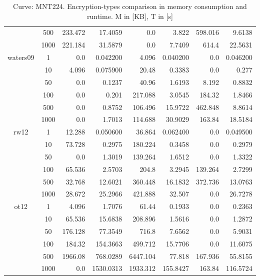 \documentclass[twoside,11pt,titlepage,a4paper,english,bibliography=totocnumbered,listof=numbered]{scrbook}
\begin{document}
\begin{table}[ht]
{\begin{tabular}{|c|c|r|r|r|r|r|r|}
&500&  233.472    &   17.4059   &    0.0      &    3.822    &  598.016    &    9.6138    \\
&1000&  221.184    &   31.5879   &    0.0      &    7.7409   &  614.4      &   22.5631    \\
\hline
\multirow{6}{*}{waters09} &1&    0.0      &    0.042200 &    4.096    &    0.040200 &    0.0      &    0.046200  \\
&10&    4.096    &    0.075900 &   20.48     &    0.3383   &    0.0      &    0.277     \\
&50&    0.0      &    0.1237   &   40.96     &    1.6193   &    8.192    &    0.8832    \\
&100&    0.0      &    0.201    &  217.088    &    3.0545   &  184.32     &    1.8466    \\
&500&    0.0      &    0.8752   &  106.496    &   15.9722   &  462.848    &    8.8614    \\
&1000&    0.0      &    1.7013   &  114.688    &   30.9029   &  163.84     &   18.5184    \\
\hline
\multirow{6}{*}{rw12} &1&   12.288    &    0.050600 &   36.864    &    0.062400 &    0.0      &    0.049500  \\
&10&   73.728    &    0.2975   &  180.224    &    0.3458   &    0.0      &    0.2979    \\
&50&    0.0      &    1.3019   &  139.264    &    1.6512   &    0.0      &    1.3322    \\
&100&   65.536    &    2.5703   &  204.8      &    3.2945   &  139.264    &    2.7299    \\
&500&   32.768    &   12.6021   &  360.448    &   16.1832   &  372.736    &   13.0763    \\
&1000&   28.672    &   25.2966   &  421.888    &   32.507    &    0.0      &   26.7278    \\
\hline
\multirow{6}{*}{ot12} &1&    4.096    &    1.7076   &   61.44     &    0.1933   &    0.0      &    0.2363    \\
&10&   65.536    &   15.6838   &  208.896    &    1.5616   &    0.0      &    1.2872    \\
&50&  176.128    &   77.3549   &  716.8      &    7.6562   &    0.0      &    5.9031    \\
&100&  184.32     &  154.3663   &  499.712    &   15.7706   &    0.0      &   11.6075    \\
&500& 1966.08     &  768.0289   & 6447.104    &   77.818    &  167.936    &   55.8155    \\
&1000&    0.0      & 1530.0313   & 1933.312    &  155.8427   &  163.84     &  116.5724    \\
\hline
\end{tabular}}\caption{Curve: MNT224. Encryption-types comparison in memory consumption and runtime. M in [KB], T in [s]}\label{table:abe_mem_run_MNT224} \end{table} 
\end{document}
